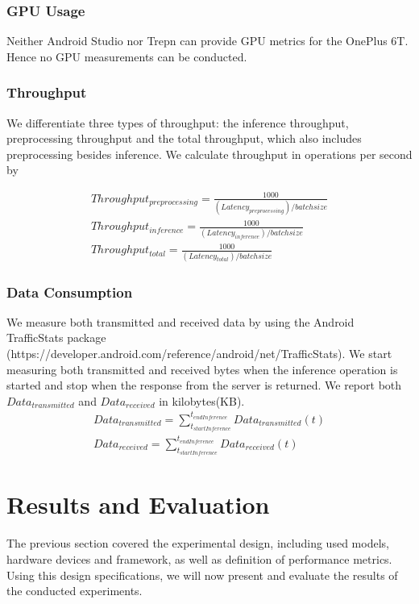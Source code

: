 \subsubsection{GPU Usage}
Neither Android Studio nor Trepn can provide GPU metrics for the OnePlus 6T. Hence no GPU measurements can be conducted.
\subsubsection{Throughput}
We differentiate three types of throughput: the inference throughput, preprocessing throughput and the total throughput, which also includes preprocessing besides inference.
We calculate throughput in operations per second by 

\begin{equation*}
\begin{gathered}
Throughput_{preprocessing} =\frac{1000}{(Latency_{preprocessing}) / batchsize}\\
Throughput_{inference} =\frac{1000}{(Latency_{inference}) / batchsize}\\
Throughput_{total}  =\frac{1000}{(Latency_{total}) / batchsize}
\end{gathered}
\end{equation*}
\subsubsection{Data Consumption}
We measure both transmitted and received data by using the Android TrafficStats package (https://developer.android.com/reference/android/net/TrafficStats). We start measuring both transmitted and received bytes when the inference operation is started and stop when the response from the server is returned. We report both $Data_{transmitted}$ and $Data_{received}$ in kilobytes(KB).
\begin{equation*}
\begin{gathered}
Data_{transmitted} = \sum_{t_{startInference}}^{t_{endInference}} Data_{transmitted}(t)\\
Data_{received} = \sum_{t_{startInference}}^{t_{endInference}} Data_{received}(t)
\end{gathered}
\end{equation*}
\section{Results and Evaluation}
The previous section covered the experimental design, including used models, hardware devices and framework, as well as definition of performance metrics. Using this design specifications, we will now present and evaluate the results of the conducted experiments.


